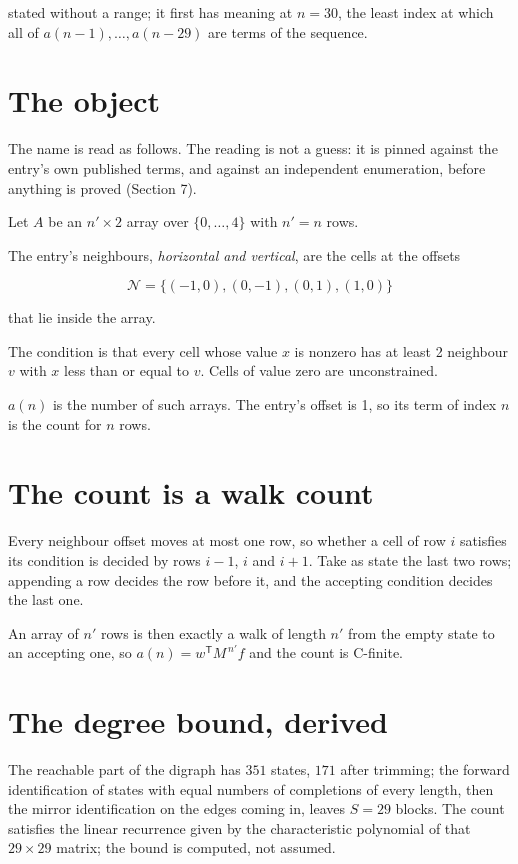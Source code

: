 \documentclass[11pt]{article}
\theoremstyle{definition}
\begin{document}
stated without a range; it first has meaning at $n = 30$, the least index at which all of $a(n-1),\dots,a(n-29)$ are terms of the sequence.

\section{The object}

The name is read as follows. The reading is not a guess: it is pinned against the entry's own published terms, and against an independent enumeration, before anything is proved (Section 7).

Let $A$ be an $n' \times 2$ array over $\{0,\dots,4\}$ with $n' = n$ rows.

The entry's neighbours, {\itshape horizontal and vertical}, are the cells at the offsets

\[\mathcal{N} = \{(-1,0), (0,-1), (0,1), (1,0)\}\]

that lie inside the array.

The condition is that every cell whose value $x$ is nonzero has at least 2 neighbour $v$ with $x$ less than or equal to $v$. Cells of value zero are unconstrained.

$a(n)$ is the number of such arrays. The entry's offset is 1, so its term of index $n$ is the count for $n$ rows.

\section{The count is a walk count}

Every neighbour offset moves at most one row, so whether a cell of row $i$ satisfies its condition is decided by rows $i-1$, $i$ and $i+1$. Take as state the last two rows; appending a row decides the row before it, and the accepting condition decides the last one.

An array of $n'$ rows is then exactly a walk of length $n'$ from the empty state to an accepting one, so $a(n) = w^{\mathsf T}M^{\,n'}f$ and the count is C-finite.

\section{The degree bound, derived}

The reachable part of the digraph has $351$ states, $171$ after trimming; the forward identification of states with equal numbers of completions of every length, then the mirror identification on the edges coming in, leaves $S = 29$ blocks. The count satisfies the linear recurrence given by the characteristic polynomial of that $29\times29$ matrix; the bound is computed, not assumed.
\end{document}
